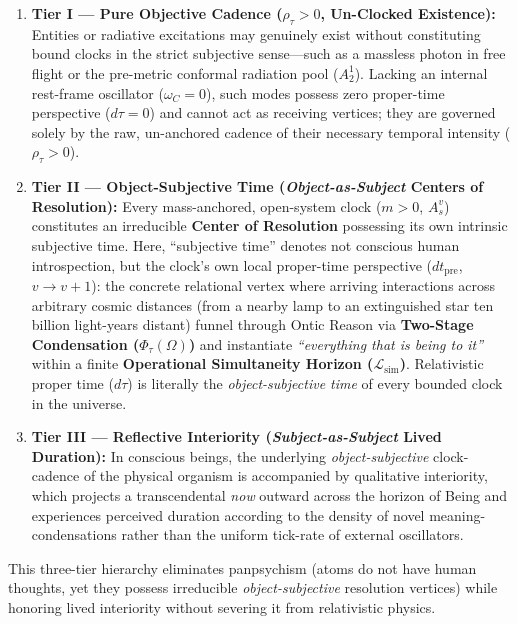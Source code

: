 \documentclass[
]{article}
\providecommand{\tightlist}{%
  \setlength{\itemsep}{0pt}\setlength{\parskip}{0pt}}
\begin{document}
\begin{enumerate}
\def\labelenumi{\arabic{enumi}.}
\tightlist
\item
  \textbf{Tier I --- Pure Objective Cadence (\(\rho_\tau > 0\),
  Un-Clocked Existence):} Entities or radiative excitations may
  genuinely exist without constituting bound clocks in the strict
  subjective sense---such as a massless photon in free flight or the
  pre-metric conformal radiation pool (\(A_2^1\)). Lacking an internal
  rest-frame oscillator (\(\omega_C = 0\)), such modes possess zero
  proper-time perspective (\(d\tau = 0\)) and cannot act as receiving
  vertices; they are governed solely by the raw, un-anchored cadence of
  their necessary temporal intensity (\(\rho_\tau > 0\)).
\item
  \textbf{Tier II --- Object-Subjective Time (\emph{Object-as-Subject}
  Centers of Resolution):} Every mass-anchored, open-system clock
  (\(m > 0\), \(A_s^v\)) constitutes an irreducible \textbf{Center of
  Resolution} possessing its own intrinsic subjective time. Here,
  ``subjective time'' denotes not conscious human introspection, but the
  clock's own local proper-time perspective (\(dt_{\mathrm{pre}}\),
  \(v \to v + 1\)): the concrete relational vertex where arriving
  interactions across arbitrary cosmic distances (from a nearby lamp to
  an extinguished star ten billion light-years distant) funnel through
  Ontic Reason via \textbf{Two-Stage Condensation
  (\(\Phi_\tau(\Omega)\))} and instantiate \emph{``everything that is
  being to it''} within a finite \textbf{Operational Simultaneity
  Horizon (\(\mathcal{L}_{\mathrm{sim}}\))}. Relativistic proper time
  (\(d\tau\)) is literally the \emph{object-subjective time} of every
  bounded clock in the universe.
\item
  \textbf{Tier III --- Reflective Interiority (\emph{Subject-as-Subject}
  Lived Duration):} In conscious beings, the underlying
  \emph{object-subjective} clock-cadence of the physical organism is
  accompanied by qualitative interiority, which projects a
  transcendental \emph{now} outward across the horizon of Being and
  experiences perceived duration according to the density of novel
  meaning-condensations rather than the uniform tick-rate of external
  oscillators.
\end{enumerate}

This three-tier hierarchy eliminates panpsychism (atoms do not have
human thoughts, yet they possess irreducible \emph{object-subjective}
resolution vertices) while honoring lived interiority without severing
it from relativistic physics.
\end{document}
